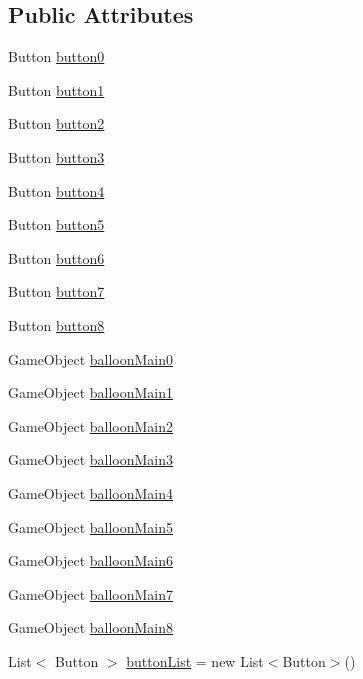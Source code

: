 \subsection*{Public Attributes}
\begin{DoxyCompactItemize}
\item 
Button \hyperlink{classView_ab24c89ecf477d77b956221a7b24976d5}{button0}
\item 
Button \hyperlink{classView_aee755ead44f4386d3cafd0c3aec5f4fb}{button1}
\item 
Button \hyperlink{classView_a63910e46c76f43286b5a761de47a3aeb}{button2}
\item 
Button \hyperlink{classView_ab330218dd82658f3abe34d3fea5c2fab}{button3}
\item 
Button \hyperlink{classView_a249b9c2451b7fbf9d969c5f3e1fbdfc4}{button4}
\item 
Button \hyperlink{classView_ae3a6abfbc84463714aa3144c12c38ba4}{button5}
\item 
Button \hyperlink{classView_ac55a000c8304cc86df581fe78c7eb08e}{button6}
\item 
Button \hyperlink{classView_a56874d01e74b8a37e0019ce81ce5c8ed}{button7}
\item 
Button \hyperlink{classView_a7fe9a1e5d0ef962a54e00fe4b7815c1b}{button8}
\item 
Game\+Object \hyperlink{classView_aaa0f9d99fe29ef9a4eba300d45feeabe}{balloon\+Main0}
\item 
Game\+Object \hyperlink{classView_a5d188e31ed902ed3968533f884dca9f5}{balloon\+Main1}
\item 
Game\+Object \hyperlink{classView_a67500752a0337243ac0e3eadd5f310b3}{balloon\+Main2}
\item 
Game\+Object \hyperlink{classView_a3d8319d6190dc2c8fba42a5beabc473a}{balloon\+Main3}
\item 
Game\+Object \hyperlink{classView_a88448abb2beed073ba07cbe9c2e1b2a1}{balloon\+Main4}
\item 
Game\+Object \hyperlink{classView_a2b6770bc88911285178e85df8c8217cc}{balloon\+Main5}
\item 
Game\+Object \hyperlink{classView_a4f9376e09967c775e3a195c85b7ab2ca}{balloon\+Main6}
\item 
Game\+Object \hyperlink{classView_a94dac7f0bcd5897db614c2ee6632c6fc}{balloon\+Main7}
\item 
Game\+Object \hyperlink{classView_aef99e7ebac1c186e6d689290970bd29e}{balloon\+Main8}
\item 
List$<$ Button $>$ \hyperlink{classView_a43cf4c0712a5ee52704dd6a0c2dd1ae3}{button\+List} = new List$<$Button$>$()

\end{DoxyCompactItemize}
